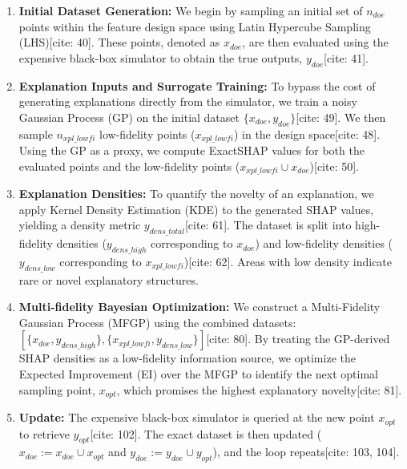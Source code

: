 \documentclass[sn-mathphys]{sn-jnl}
\theoremstyle{thmstyleone}%
\theoremstyle{thmstyletwo}%
\theoremstyle{thmstylethree}%
\begin{document}
\begin{enumerate}
    \item \textbf{Initial Dataset Generation:} We begin by sampling an initial set of $n_{doe}$ points within the feature design space using Latin Hypercube Sampling (LHS)[cite: 40]. These points, denoted as $x_{doe}$, are then evaluated using the expensive black-box simulator to obtain the true outputs, $y_{doe}$[cite: 41].
    
    \item \textbf{Explanation Inputs and Surrogate Training:} To bypass the cost of generating explanations directly from the simulator, we train a noisy Gaussian Process (GP) on the initial dataset $\{x_{doe}, y_{doe}\}$[cite: 49]. We then sample $n_{xpl\_lowfi}$ low-fidelity points ($x_{xpl\_lowfi}$) in the design space[cite: 48]. Using the GP as a proxy, we compute ExactSHAP values for both the evaluated points and the low-fidelity points ($x_{xpl\_lowfi} \cup x_{doe}$)[cite: 50]. 
    
    \item \textbf{Explanation Densities:} To quantify the novelty of an explanation, we apply Kernel Density Estimation (KDE) to the generated SHAP values, yielding a density metric $y_{dens\_total}$[cite: 61]. The dataset is split into high-fidelity densities ($y_{dens\_high}$ corresponding to $x_{doe}$) and low-fidelity densities ($y_{dens\_low}$ corresponding to $x_{xpl\_lowfi}$)[cite: 62]. Areas with low density indicate rare or novel explanatory structures.
    
    \item \textbf{Multi-fidelity Bayesian Optimization:} We construct a Multi-Fidelity Gaussian Process (MFGP) using the combined datasets: $[\{x_{doe}, y_{dens\_high}\}, \{x_{xpl\_lowfi}, y_{dens\_low}\}]$[cite: 80]. By treating the GP-derived SHAP densities as a low-fidelity information source, we optimize the Expected Improvement (EI) over the MFGP to identify the next optimal sampling point, $x_{opt}$, which promises the highest explanatory novelty[cite: 81].
    
    \item \textbf{Update:} The expensive black-box simulator is queried at the new point $x_{opt}$ to retrieve $y_{opt}$[cite: 102]. The exact dataset is then updated ($x_{doe} := x_{doe} \cup x_{opt}$ and $y_{doe} := y_{doe} \cup y_{opt}$), and the loop repeats[cite: 103, 104].
\end{enumerate}
\end{document}
